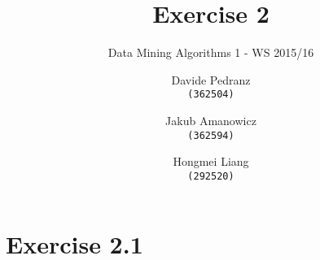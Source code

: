 \documentclass{scrartcl}
\title{Exercise 2}
\subtitle{Data Mining Algorithms 1 - WS 2015/16}
\author{
  Davide Pedranz\\ \texttt{(362504)}
  \and
  Jakub Amanowicz \\ \texttt{(362594)}
  \and
  Hongmei Liang\\  \texttt{(292520)}
}
\begin{document}
\maketitle

\section*{Exercise 2.1}

\end{document}

